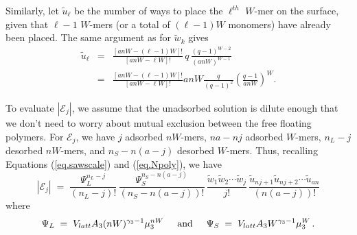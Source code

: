 \documentclass[12pt]{article}
\begin{document}
Similarly, let $\tilde{u}_{\ell}$ be the number of ways to place the $\ell^{th}$ $W$-mer on the surface, given that
${\ell}-1$ $W$-mers (or a total of $(\ell-1)W$ monomers) have already been placed.   The same 
argument as for $\tilde{w}_k$ gives
\begin{eqnarray}
   \tilde{u}_{\ell}  
 & = &    \frac{[anW-(\ell-1)W]!}{[anW-\ell W]!} \,q\,  \frac{(q-1)^{W-2}}{(anW)^{W-1}}  
     \nonumber    \\
     & = &    \frac{[anW-(\ell-1)W]!}{[anW-\ell W]!}   anW \frac{q}{(q-1)^2}\left(  \frac{q-1}{anW}\right)^{W}.
     \label{eq.uell2}
\end{eqnarray}

To evaluate $|\mathcal{E}_j|$, we assume that the unadsorbed solution
is dilute enough that we don't need to worry about mutual exclusion between the free floating
polymers.   
For $\mathcal{E}_j$, we have $j$ adsorbed $nW$-mers, $na-nj$ adsorbed $W$-mers, 
$n_L-j$ desorbed $nW$-mers, and $n_S-n(a-j)$ desorbed $W$-mers.   Thus, recalling 
Equations (\ref{eq.sawscale}) and  (\ref{eq.Npoly}), we have
\begin{equation}
    |\mathcal{E}_j|  
      \; = \; \frac{ \Psi_L^{n_L-j} }{(n_L-j)!} \,
          \frac{ \Psi_S^{n_S-n(a-j)} }{(n_S-n(a-j))!} \,
           \frac{\tilde{w}_1\tilde{w}_2\cdots \tilde{w}_j}{j!}
                     \,   \frac{\tilde{u}_{nj+1}\tilde{u}_{nj+2}\cdots \tilde{u}_{an}}{(n(a-j))!}
        \label{eq.Yj}
\end{equation}
where 
\begin{equation}
    \label{eq.psidef}   
   \Psi_L\;=\;V_{latt} A_3 (nW)^{\gamma_3-1} \mu_{3}^{nW}   
    \hspace{5mm}\hbox{and} \hspace{5mm}
     \Psi_S \;=\; V_{latt}A_3W^{\gamma_3-1}\mu_3^W \,.
\end{equation}
\end{document}
